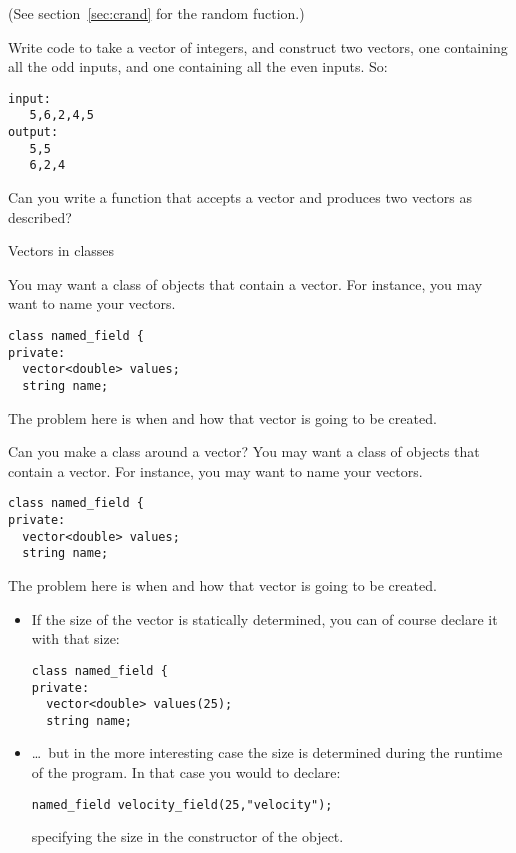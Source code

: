(See section~\ref{sec:crand} for the random fuction.)

\begin{exercise}
  \label{ex:splitoddeven}
  Write code to take a vector of integers, and construct two
  vectors, one containing all the odd inputs, and one containing all
  the even inputs. So:
\begin{lstlisting}
input:
   5,6,2,4,5
output:
   5,5
   6,2,4
\end{lstlisting}
  Can you write a function that accepts a vector and produces two
  vectors as described?
\end{exercise}

 {Vectors in classes}
\label{sec:class-w-vector}

You may want a class of objects that contain a vector.
For instance, you may want to name your vectors.
\begin{lstlisting}
class named_field {
private:
  vector<double> values;
  string name;
\end{lstlisting}
The problem here is when and how that vector is going to be created.

\begin{slide}{Can you make a class around a vector?}
  \label{sl:class-with-vector}
You may want a class of objects that contain a vector.
For instance, you may want to name your vectors.
  \lstset{style=snippetcode}
\begin{lstlisting}
class named_field {
private:
  vector<double> values;
  string name;
\end{lstlisting}
The problem here is when and how that vector is going to be created.
\end{slide}

\begin{itemize}
\item If the size of the vector is statically determined,
  you can of course declare it with that size:
\begin{lstlisting}
class named_field {
private:
  vector<double> values(25);
  string name;
\end{lstlisting}
\item \ldots~but in the more interesting case the size is determined
  during the runtime of the program. In that case you would to declare:
\begin{lstlisting}
named_field velocity_field(25,"velocity");
\end{lstlisting}
specifying the size in the constructor of the object.
\end{itemize}

